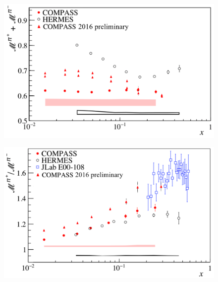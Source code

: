 \documentclass[letterpaper,12pt]{article}
\begin{document}
\begin{figure}[H]
	\includegraphics[scale=0.38]{./gfx/Pis.png}
	\caption{}
	\label{Pis}
\end{figure}

\begin{figure}[H]
	\includegraphics[scale=0.38]{./gfx/Pir.png}
	\caption{}
	\label{Pir}
\end{figure}
\end{document}
